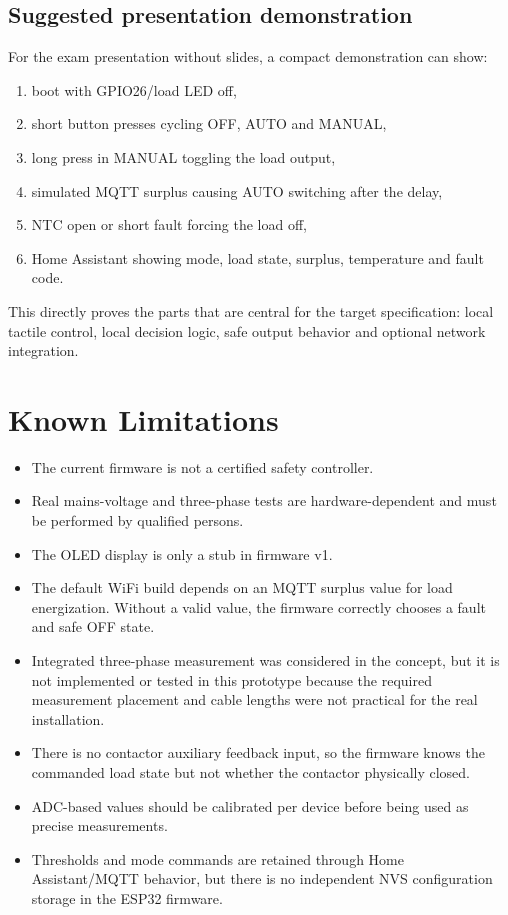 \documentclass[12pt,a4paper]{article}
\begin{document}
\subsection{Suggested presentation demonstration}

For the exam presentation without slides, a compact demonstration can show:

\begin{enumerate}
  \item boot with GPIO26/load LED off,
  \item short button presses cycling OFF, AUTO and MANUAL,
  \item long press in MANUAL toggling the load output,
  \item simulated MQTT surplus causing AUTO switching after the delay,
  \item NTC open or short fault forcing the load off,
  \item Home Assistant showing mode, load state, surplus, temperature and fault
  code.
\end{enumerate}

This directly proves the parts that are central for the target specification:
local tactile control, local decision logic, safe output behavior and optional
network integration.

\newpage
\section{Known Limitations}

\begin{itemize}
  \item The current firmware is not a certified safety controller.
  \item Real mains-voltage and three-phase tests are hardware-dependent and must
  be performed by qualified persons.
  \item The OLED display is only a stub in firmware v1.
  \item The default WiFi build depends on an MQTT surplus value for load
  energization. Without a valid value, the firmware correctly chooses a fault and
  safe OFF state.
  \item Integrated three-phase measurement was considered in the concept, but it
  is not implemented or tested in this prototype because the required measurement
  placement and cable lengths were not practical for the real installation.
  \item There is no contactor auxiliary feedback input, so the firmware knows the
  commanded load state but not whether the contactor physically closed.
  \item ADC-based values should be calibrated per device before being used as
  precise measurements.
  \item Thresholds and mode commands are retained through Home Assistant/MQTT
  behavior, but there is no independent NVS configuration storage in the ESP32
  firmware.
\end{itemize}
\end{document}

